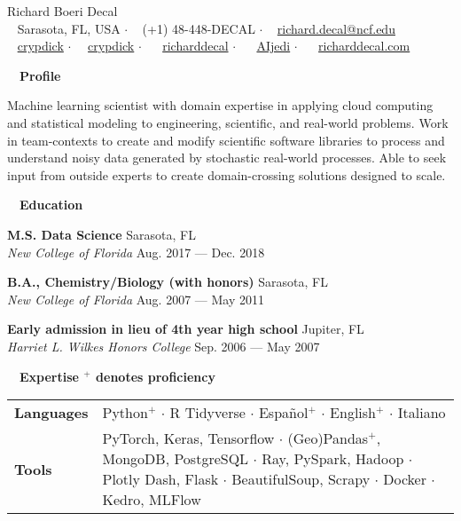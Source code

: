 \documentclass[a4paper,12pt]{article}
\newcommand{\resheading}[1]{{\hspace{-9pt} \colorbox{mygrey}{\begin{minipage}{\textwidth}{\textmd{~~\large \textbf{#1} \vphantom{p\^{E}}}}\end{minipage}}\vspace{6pt}} }
\newcommand{\ressubheading}[4]{{\begin{minipage}{\textwidth}
        \textbf{#1} \hfill #2 \\
        \textit{#3} \hfill #4 \\
        \end{minipage}}}
\begin{document}
\begin{center}
{\Huge Richard Boeri Decal} \\
{\small \faMapMarker~ Sarasota, FL, USA $\cdot$ \faPhone~ (+1) 48-448-DECAL $\cdot$ \faEnvelope~ \href{mailto:richard.decal@ncf.edu}{richard.decal@ncf.edu}  \\ \faGithubAlt~ \href{https://github.com/crypdick}{crypdick} $\cdot$~\faStackOverflow~  \href{https://stackoverflow.com/users/4212158/crypdick}{crypdick} $\cdot$ ~\faLinkedin~ \href{https://www.linkedin.com/in/richarddecal/}{richarddecal}  $\cdot$ ~\faTwitter~ \href{https://twitter.com/AIjedi}{AIjedi}  $\cdot$ ~\faHome~  \href{http://www.richarddecal.com}{richarddecal.com}}
\end{center}

\resheading{Profile}

Machine learning scientist with domain expertise in applying cloud computing and statistical modeling to engineering, scientific, and real-world problems. Work in team-contexts to create and modify scientific software libraries to process and understand noisy data generated by stochastic real-world processes. Able to seek input from outside experts to create domain-crossing solutions designed to scale. \\

\resheading{Education}

    \ressubheading{M.S. Data Science}{Sarasota, FL}{New College of Florida}{Aug. 2017 --- Dec. 2018}


 
    \ressubheading{B.A., Chemistry/Biology (with honors)}{Sarasota, FL}{New College of Florida}{Aug. 2007 --- May 2011}

    \ressubheading{Early admission in lieu of 4th year high school}{Jupiter, FL}{Harriet L. Wilkes Honors College}{Sep. 2006 --- May 2007}


\resheading{Expertise \hfill {\small$^+$ denotes proficiency}}

\vspace{-1em}
\begin{tabularx}{\textwidth}{p{2.5cm}>{\arraybackslash}X}
  \bfseries{Languages} & Python$^+$ $\cdot$ R Tidyverse $\cdot$ Espa\~nol$^+$ $\cdot$ English$^+$ $\cdot$ Italiano \\  %
  \bfseries{Tools} & PyTorch, Keras, Tensorflow $\cdot$ (Geo)Pandas$^+$, \mbox{MongoDB}, PostgreSQL $\cdot$ Ray, PySpark, Hadoop $\cdot$ Plotly Dash, Flask  $\cdot$ BeautifulSoup, Scrapy $\cdot$ Docker $\cdot$ Kedro, MLFlow  \\
\end{tabularx}
\end{document}
